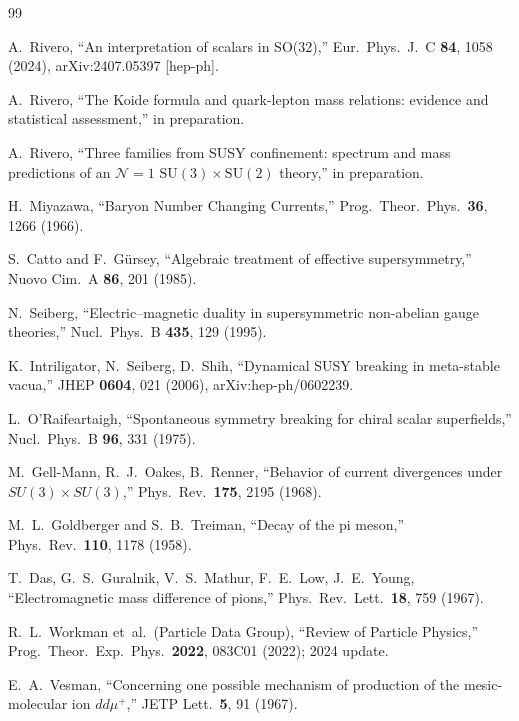 \documentclass[12pt,a4paper]{article}
\begin{document}
\begin{thebibliography}{99}

A.~Rivero, ``An interpretation of scalars in SO(32),''
Eur.\ Phys.\ J.\ C \textbf{84}, 1058 (2024),
arXiv:2407.05397 [hep-ph].

A.~Rivero, ``The Koide formula and quark-lepton mass relations:
evidence and statistical assessment,'' in preparation.

A.~Rivero, ``Three families from SUSY confinement: spectrum and mass
predictions of an $\mathcal{N}=1$ $\mathrm{SU}(3)\times\mathrm{SU}(2)$
theory,'' in preparation.

H.~Miyazawa, ``Baryon Number Changing Currents,''
Prog.\ Theor.\ Phys.\ \textbf{36}, 1266 (1966).

S.~Catto and F.~G\"ursey, ``Algebraic treatment of effective
supersymmetry,'' Nuovo Cim.\ A \textbf{86}, 201 (1985).

N.~Seiberg, ``Electric--magnetic duality in supersymmetric
non-abelian gauge theories,'' Nucl.\ Phys.\ B \textbf{435}, 129
(1995).

K.~Intriligator, N.~Seiberg, D.~Shih, ``Dynamical SUSY breaking
in meta-stable vacua,'' JHEP \textbf{0604}, 021 (2006),
arXiv:hep-ph/0602239.

L.~O'Raifeartaigh, ``Spontaneous symmetry breaking for chiral
scalar superfields,'' Nucl.\ Phys.\ B \textbf{96}, 331 (1975).

M.~Gell-Mann, R.~J.~Oakes, B.~Renner, ``Behavior of current
divergences under $SU(3) \times SU(3)$,''
Phys.\ Rev.\ \textbf{175}, 2195 (1968).

M.~L.~Goldberger and S.~B.~Treiman, ``Decay of the pi meson,''
Phys.\ Rev.\ \textbf{110}, 1178 (1958).

T.~Das, G.~S.~Guralnik, V.~S.~Mathur, F.~E.~Low, J.~E.~Young,
``Electromagnetic mass difference of pions,''
Phys.\ Rev.\ Lett.\ \textbf{18}, 759 (1967).

R.~L.~Workman et~al.\ (Particle Data Group), ``Review of Particle
Physics,'' Prog.\ Theor.\ Exp.\ Phys.\ \textbf{2022}, 083C01 (2022);
2024 update.

E.~A.~Vesman, ``Concerning one possible mechanism of production of
the mesic-molecular ion $dd\mu^+$,''
JETP Lett.\ \textbf{5}, 91 (1967).


\end{thebibliography}
\end{document}
